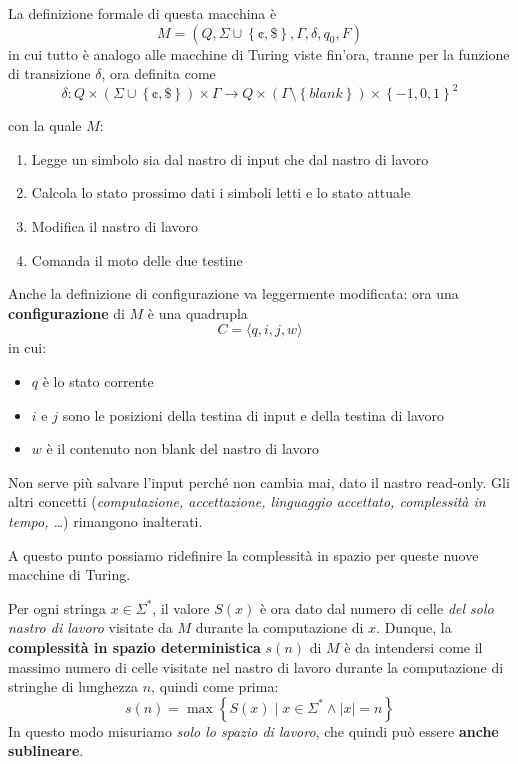 La definizione formale di questa macchina è 
$$ M = \left(Q, \Sigma \cup \left\{\cent, \$\right\}, \Gamma, \delta, q_0, F \right) $$
in cui tutto è analogo alle macchine di Turing viste fin'ora, tranne per la funzione di transizione $\delta$, ora definita come
$$ \delta: Q \times \left(\Sigma \cup \left\{\cent, \$ \right\}\right) \times \Gamma \rightarrow Q \times \left(\Gamma \setminus \left\{blank\right\}\right) \times \left\{-1, 0, 1\right\}^2 $$

con la quale $M$:
\begin{enumerate}
	\item Legge un simbolo sia dal nastro di input che dal nastro di lavoro
    
	\item Calcola lo stato prossimo dati i simboli letti e lo stato attuale
    
	\item Modifica il nastro di lavoro 
	
    \item Comanda il moto delle due testine
\end{enumerate}

Anche la definizione di configurazione va leggermente modificata: ora una \textbf{configurazione} di $M$ è una quadrupla
$$ C = \langle q, i, j, w \rangle $$
in cui:
\begin{itemize}
	\item $q$ è lo stato corrente
    
	\item $i$ e $j$ sono le posizioni della testina di input e della testina di lavoro 
	
    \item $w$ è il contenuto non blank del nastro di lavoro
\end{itemize}

Non serve più salvare l'input perché non cambia mai, dato il nastro read-only. Gli altri concetti (\textit{computazione, accettazione, linguaggio accettato, complessità in tempo, \dots}) rimangono inalterati.

A questo punto possiamo ridefinire la complessità in spazio per queste nuove macchine di Turing.

Per ogni stringa $x \in \Sigma^\ast$, il valore $S(x)$ è ora dato dal numero di celle \textit{del solo nastro di lavoro} visitate da $M$ durante la computazione di $x$. Dunque, la \textbf{complessità in spazio deterministica} $s(n)$ di $M$ è da intendersi come il massimo numero di celle visitate nel nastro di lavoro durante la computazione di stringhe di lunghezza $n$, quindi come prima: 
$$ s(n) = \max \left\{ S(x) \mid x \in \Sigma^\ast \wedge |x| = n \right\} $$
In questo modo misuriamo \textit{solo lo spazio di lavoro}, che quindi può essere \textbf{anche sublineare}.

